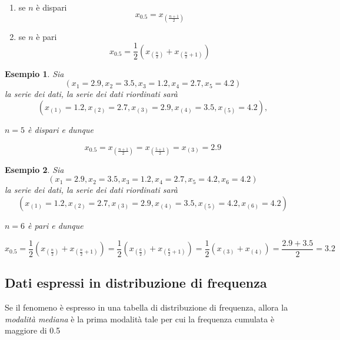 \documentclass[
  11pt,
]{book}
\providecommand{\tightlist}{%
  \setlength{\itemsep}{0pt}\setlength{\parskip}{0pt}}
\theoremstyle{mytheoremstyle}
\theoremstyle{mydefstyle}
\newtheorem{example}{{Esempio}}[section]
\begin{document}
\begin{info}

\begin{enumerate}
\def\labelenumi{\arabic{enumi}.}
\tightlist
\item
  se \(n\) è dispari
  \[x_{0.5}=x_{\left(\frac{n+1}{2}\right)}\]
\item
  se \(n\) è pari
  \[x_{0.5}=\frac 1 2 \left(x_{\left(\frac{n}{2}\right)}+x_{\left(\frac{n}{2}+1\right)}\right)\]
\end{enumerate}

\end{info}

\begin{example}
Sia
\[(x_1=2.9,x_2=3.5,x_3=1.2,x_4=2.7, x_5=4.2)\]
la serie dei dati, la serie dei dati riordinati sarà
\[(x_{(1)}=1.2, x_{(2)}=2.7, x_{(3)}=2.9, x_{(4)}=3.5,x_{(5)}=4.2),\]

\(n=5\) è dispari e dunque

\[x_{0.5}=x_{\left(\frac{n+1}{2}\right)}=x_{\left(\frac{5+1}{2}\right)}=x_{\left(3\right)}=2.9\]
\end{example}

\begin{example}
Sia
\[(x_1=2.9,x_2=3.5,x_3=1.2,x_4=2.7, x_5=4.2, x_6=4.2)\]
la serie dei dati, la serie dei dati riordinati sarà
\[(x_{(1)}=1.2, x_{(2)}=2.7, x_{(3)}=2.9, x_{(4)}=3.5,x_{(5)}=4.2,x_{(6)}=4.2)\]

\(n=6\) è pari e dunque

\[x_{0.5}=\frac 1 2 \left(x_{\left(\frac{n}{2}\right)}+x_{\left(\frac{n}{2}+1\right)}\right)=
\frac 1 2 \left(x_{\left(\frac{6}{2}\right)}+x_{\left(\frac{6}{2}+1\right)}\right)=
\frac 1 2 \left(x_{\left(3\right)}+x_{\left(4\right)}\right)=\frac{2.9+3.5}2=3.2\]
\end{example}

\subsection{Dati espressi in distribuzione di frequenza}\label{dati-espressi-in-distribuzione-di-frequenza}

Se il fenomeno è espresso in una tabella di distribuzione di frequenza, allora la \emph{modalità mediana} è la prima modalità tale per cui la frequenza cumulata è maggiore di 0.5
\end{document}
